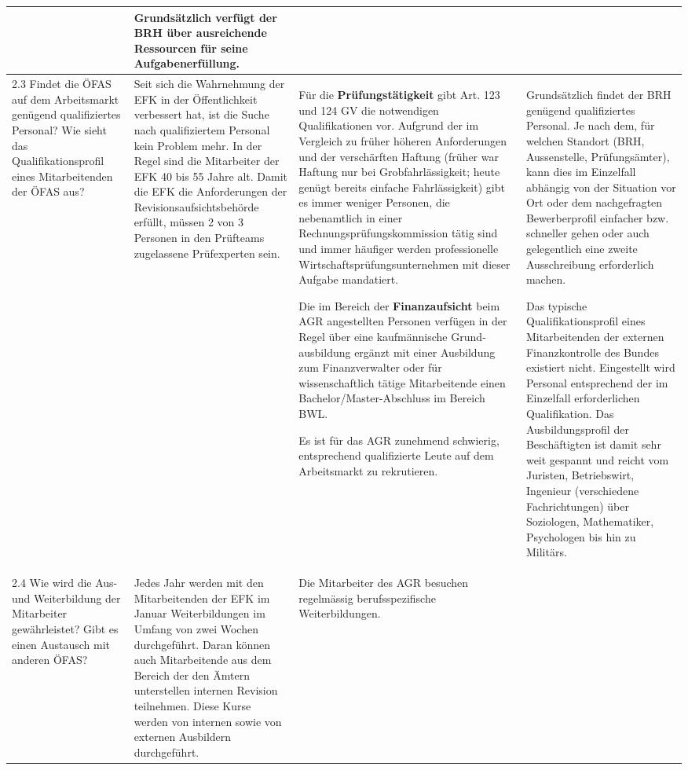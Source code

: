 \documentclass[10pt]{article}
\begin{document}
\begin{landscape}
\begin{center}
\begin{longtable}{|p{4cm}|p{5cm}|p{7.5cm}|p{7.5cm}|}
 & Grundsätzlich verfügt der BRH über ausreichende Ressourcen für seine Aufgabenerfüllung.

 \\
\hline
2.3 Findet die ÖFAS auf dem Arbeitsmarkt genügend qualifiziertes Personal? Wie sieht das Qualifikationsprofil eines Mitarbeitenden der ÖFAS aus? & Seit sich die Wahrnehmung der EFK in der Öffentlichkeit verbessert hat, ist die Suche nach qualifiziertem Personal kein Problem mehr. In der Regel sind die Mitarbeiter der EFK 40 bis  55 Jahre alt. Damit  die EFK die Anforderungen der Revisions­auf­sichts­behörde erfüllt, müssen 2 von 3 Personen in den Prüfteams zugelassene Prüfexperten sein. & Für die \textbf{Prüfungstätigkeit} gibt Art. 123 und 124 GV die notwendigen Qualifikationen vor. Aufgrund der im Vergleich zu früher höheren Anforderungen und der verschärften Haftung (früher war Haftung nur bei Grobfahrlässigkeit; heute genügt bereits einfache Fahrlässigkeit) gibt es immer weniger Personen, die nebenamtlich in einer Rechnungsprüfungskommission tätig sind und immer häufiger werden professionelle Wirtschafts­prüfungs­unternehmen mit dieser Aufgabe mandatiert.

Die im Bereich der \textbf{Finanzauf­sicht­} beim AGR angestellten Personen verfügen in der Regel über eine kaufmännische Grund­ausbildung ergänzt mit einer Aus­bildung zum Finanzverwalter oder für wissenschaftlich tätige Mitarbeitende einen Bachelor/Master-Abschluss im Bereich BWL.

Es ist für das AGR zunehmend schwierig, entsprechend qualifizierte Leute auf dem Arbeitsmarkt zu rekrutieren. 

 & Grundsätzlich findet der BRH genügend qualifiziertes Personal. Je nach dem, für welchen Standort (BRH, Aussenstelle, Prüfungsämter), kann dies im Einzelfall abhängig von der Situation vor Ort oder dem nachgefragten Bewerberprofil einfacher bzw. schneller gehen oder auch gelegentlich eine zweite Ausschreibung erforderlich machen.

Das typische Qualifikationsprofil eines Mitarbeitenden der externen Finanzkontrolle des Bundes existiert nicht. Eingestellt wird Personal entsprechend der im Einzelfall erforderlichen Qualifikation. Das Ausbildungsprofil der Beschäftigten ist damit sehr weit gespannt und reicht vom Juristen, Betriebswirt, Ingenieur (verschiedene Fachrichtungen) über Soziologen, Mathematiker, Psychologen bis hin zu Militärs.

 \\
\hline
2.4 Wie wird die Aus- und Weiterbildung der Mitarbeiter gewährleistet? Gibt es einen Austausch mit anderen ÖFAS? & Jedes Jahr werden mit den Mitarbeitenden der EFK im Januar Weiterbildungen im Umfang von zwei Wochen durchgeführt. Daran können auch Mitarbeitende aus dem Bereich der den Ämtern unterstellen internen Revision teilnehmen. Diese Kurse werden von internen sowie von externen Ausbildern durchgeführt. & Die Mitarbeiter des AGR besuchen regelmässig berufsspezifische Weiterbildungen.


\end{longtable}
\end{center}
\end{landscape}
\end{document}
